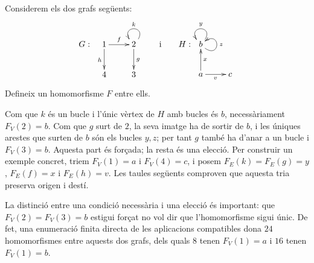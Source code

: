 \begin{exemple}
Considerem els dos grafs següents:
\[
G:\ 
\xymatrix{
	1 \ar[d]_{h} \ar[r]^{f} & 2 \ar[d]^{g} \ar@(ur,ul)_{k} \\
	4 & 3
}
\qquad\text{i}\qquad
H:\ 
\xymatrix{
	b \ar@(ur,ul)_{y} \ar@(dr,ur)_{z} \\
	a \ar[u]_{x} \ar[r]_{v} & c
}
\]
Defineix un homomorfisme $F$ entre ells.
\end{exemple}
\begin{solucio}
Com que $k$ és un bucle i l'únic vèrtex de $H$ amb bucles és $b$, necessàriament $F_V(2)=b$. Com que $g$ surt de $2$, la seva imatge ha de sortir de $b$, i les úniques arestes que surten de $b$ són els bucles $y,z$; per tant $g$ també ha d'anar a un bucle i $F_V(3)=b$. Aquesta part és forçada; la resta és una elecció. Per construir un exemple concret, triem $F_V(1)=a$ i $F_V(4)=c$, i posem $F_E(k)=F_E(g)=y$, $F_E(f)=x$ i $F_E(h)=v$. Les taules següents comproven que aquesta tria preserva origen i destí.

La distinció entre una condició necessària i una elecció és important: que $F_V(2)=F_V(3)=b$ estigui forçat no vol dir que l'homomorfisme sigui únic. De fet, una enumeració finita directa de les aplicacions compatibles dona $24$ homomorfismes entre aquests dos grafs, dels quals $8$ tenen $F_V(1)=a$ i $16$ tenen $F_V(1)=b$.


\end{solucio}
